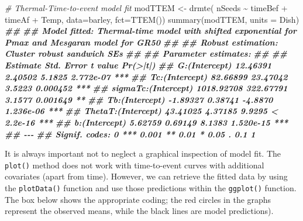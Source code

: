 \documentclass[
]{book}
\newenvironment{Shaded}{\begin{snugshade}}{\end{snugshade}}
\newcommand{\AttributeTok}[1]{\textcolor[rgb]{0.77,0.63,0.00}{#1}}
\newcommand{\CommentTok}[1]{\textcolor[rgb]{0.56,0.35,0.01}{\textit{#1}}}
\newcommand{\DocumentationTok}[1]{\textcolor[rgb]{0.56,0.35,0.01}{\textbf{\textit{#1}}}}
\newcommand{\FunctionTok}[1]{\textcolor[rgb]{0.00,0.00,0.00}{#1}}
\newcommand{\NormalTok}[1]{#1}
\newcommand{\OtherTok}[1]{\textcolor[rgb]{0.56,0.35,0.01}{#1}}
\newcommand{\SpecialCharTok}[1]{\textcolor[rgb]{0.00,0.00,0.00}{#1}}
\begin{document}
\begin{Shaded}
\begin{Highlighting}[]
\CommentTok{\# Thermal{-}Time{-}to{-}event model fit}
\NormalTok{modTTEM }\OtherTok{\textless{}{-}} \FunctionTok{drmte}\NormalTok{( nSeeds }\SpecialCharTok{\textasciitilde{}}\NormalTok{ timeBef }\SpecialCharTok{+}\NormalTok{ timeAf }\SpecialCharTok{+}\NormalTok{ Temp, }\AttributeTok{data=}\NormalTok{barley,}
               \AttributeTok{fct=}\FunctionTok{TTEM}\NormalTok{())}
\FunctionTok{summary}\NormalTok{(modTTEM, }\AttributeTok{units =}\NormalTok{ Dish)}
\DocumentationTok{\#\# }
\DocumentationTok{\#\# Model fitted: Thermal{-}time model with shifted exponential for Pmax and Mesgaran model for GR50}
\DocumentationTok{\#\# }
\DocumentationTok{\#\# Robust estimation: Cluster robust sandwich SEs }
\DocumentationTok{\#\# }
\DocumentationTok{\#\# Parameter estimates:}
\DocumentationTok{\#\# }
\DocumentationTok{\#\#                       Estimate Std. Error t value  Pr(\textgreater{}|t|)    }
\DocumentationTok{\#\# G:(Intercept)         12.46391    2.40502  5.1825 2.772e{-}07 ***}
\DocumentationTok{\#\# Tc:(Intercept)        82.66899   23.47042  3.5223  0.000452 ***}
\DocumentationTok{\#\# sigmaTc:(Intercept) 1018.92708  322.67791  3.1577  0.001649 ** }
\DocumentationTok{\#\# Tb:(Intercept)        {-}1.89327    0.38741 {-}4.8870 1.236e{-}06 ***}
\DocumentationTok{\#\# ThetaT:(Intercept)    43.41025    4.37185  9.9295 \textless{} 2.2e{-}16 ***}
\DocumentationTok{\#\# b:(Intercept)          5.62759    0.69149  8.1383 1.520e{-}15 ***}
\DocumentationTok{\#\# {-}{-}{-}}
\DocumentationTok{\#\# Signif. codes:  0 \textquotesingle{}***\textquotesingle{} 0.001 \textquotesingle{}**\textquotesingle{} 0.01 \textquotesingle{}*\textquotesingle{} 0.05 \textquotesingle{}.\textquotesingle{} 0.1 \textquotesingle{} \textquotesingle{} 1}
\end{Highlighting}
\end{Shaded}

It is always important not to neglect a graphical inspection of model fit. The \texttt{plot()} method does not work with time-to-event curves with additional covariates (apart from time). However, we can retrieve the fitted data by using the \texttt{plotData()} function and use those predictions within the \texttt{ggplot()} function. The box below shows the appropriate coding; the red circles in the graphs represent the observed means, while the black lines are model predictions).
\end{document}
